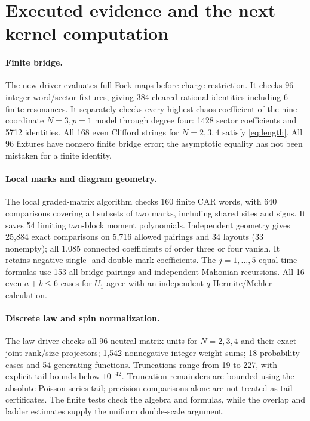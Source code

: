 \documentclass[11pt]{article}
\begin{document}
\newpage
\section{Executed evidence and the next kernel computation}
\paragraph{Finite bridge.}
The new driver evaluates full-Fock maps before charge restriction.
It checks 96 integer word/sector fixtures, giving 384 cleared-rational
identities including 6 finite resonances. It separately checks every
highest-chaos coefficient of the nine-coordinate $N=3,p=1$ model
through degree four: 1428 sector coefficients and 5712 identities.
All 168 even Clifford strings for $N=2,3,4$ satisfy
\eqref{eq:length}. All 96 fixtures have nonzero finite bridge error;
the asymptotic equality has not been mistaken for a finite identity.

\paragraph{Local marks and diagram geometry.}
The local graded-matrix algorithm checks 160 finite CAR words,
with 640 comparisons covering all subsets of two marks, including
shared sites and signs. It saves 54 limiting two-block moment
polynomials. Independent geometry gives 25,884 exact comparisons on
5,716 allowed pairings and 34 layouts (33 nonempty); all 1,085 connected
coefficients of order three or four vanish. It retains negative
single- and double-mark coefficients. The $j=1,\ldots,5$ equal-time
formulas use 153 all-bridge pairings and independent Mahonian recursions.
All 16 even $a+b\le6$ cases for $U_1$ agree with an independent
$q$-Hermite/Mehler calculation.

\paragraph{Discrete law and spin normalization.}
The law driver checks all 96 neutral matrix units for $N=2,3,4$ and
their exact joint rank/size projectors; 1,542 nonnegative integer weight
sums; 18 probability cases and 54 generating functions. Truncations
range from 19 to 227, with explicit tail bounds below $10^{-42}$.
Truncation remainders are bounded
using the absolute Poisson-series tail; precision comparisons alone
are not treated as tail certificates. The finite tests check the
algebra and formulas, while the overlap and ladder estimates supply
the uniform double-scale argument.
\end{document}
